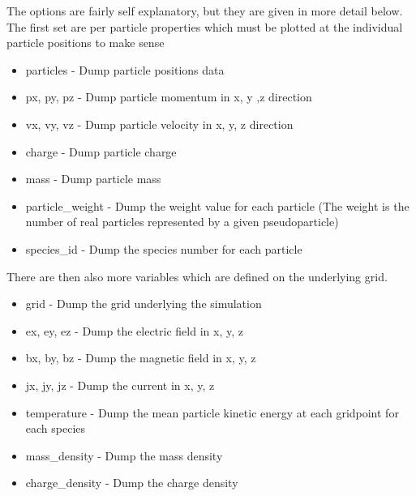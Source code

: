 \documentclass[12pt]{article}
\begin{document}
The options are fairly self explanatory, but they are given in more detail
below. The first set are per particle properties which must be plotted at the
individual particle positions to make sense\\
\begin{itemize}
\item particles - Dump particle positions data
\item px, py, pz - Dump particle momentum in x, y ,z direction
\item vx, vy, vz - Dump particle velocity in x, y, z direction
\item charge - Dump particle charge
\item mass - Dump particle mass
\item particle\_weight - Dump the weight value for each particle (The weight
  is the number of real particles represented by a given pseudoparticle)
\item species\_id - Dump the species number for each particle
\end{itemize}

There are then also more variables which are defined on the underlying grid.\\
\begin{itemize}
\item grid - Dump the grid underlying the simulation
\item ex, ey, ez - Dump the electric field in x, y, z
\item bx, by, bz - Dump the magnetic field in x, y, z
\item jx, jy, jz - Dump the current in x, y, z
\item temperature - Dump the mean particle kinetic energy at each gridpoint
  for each species
\item mass\_density - Dump the mass density
\item charge\_density - Dump the charge density
\end{itemize}
\end{document}
